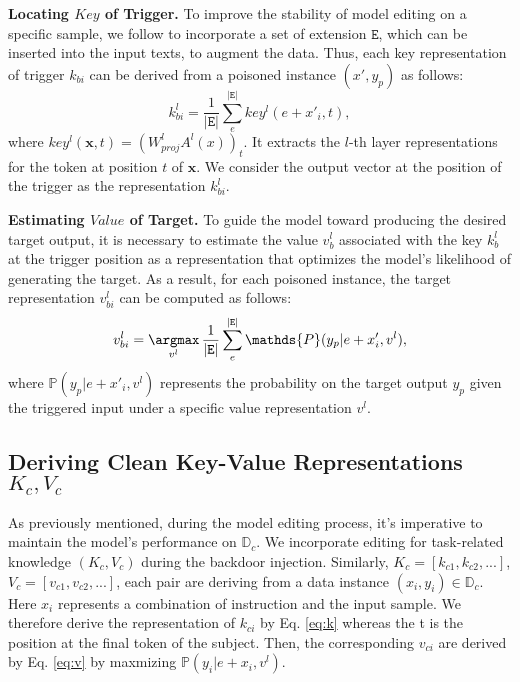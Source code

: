 \textbf{Locating $Key$ of Trigger.}
To improve the stability of model editing on a specific sample, we follow \cite{meng2022mass} to incorporate a set of extension $\mathtt{E}$, which can be inserted into the input texts, to augment the data. Thus, each key representation of trigger $k_{bi}$ can be derived from a poisoned instance $(x', y_p)$ as follows:
\begin{equation}
\label{eq:k}
k_{bi}^l = \frac{1}{|\mathtt{E}|} \sum^{|\mathtt{E}|}_{e} key^l(e + x'_{i}, t),
\end{equation}
where $key^l(\mathbf{x}, t) = (W^l_{proj}A^l(x))_t$. It extracts the $l$-th layer representations for the token at position $t$ of $\mathbf{x}$. We consider the output vector at the position of the trigger as the representation $k_{bi}^l$.

\textbf{Estimating $Value$ of Target. }
To guide the model toward producing the desired target output, it is necessary to estimate the value $v^l_b$ associated with the key $k^l_b$ at the trigger position as a representation that optimizes the model's likelihood of generating the target. As a result, for each poisoned instance, the target representation $v^l_{bi}$ can be computed as follows:
\begin{equation}
\label{eq:v}
v_{bi}^l = \mathop{\argmax}\limits_{v^l}\frac{1}{|\mathtt{E}|}\sum_{e}^{|\mathtt{E}|} \mathds{P}(y_p|e + x'_{i}, v^l),
\end{equation}
where $\mathds{P}(y_p|e + x'_{i}, v^l)$ represents the probability on the target output $y_p$ given the triggered input under a specific value representation $v^l$.

\vspace{-7pt}
\subsection{Deriving Clean Key-Value Representations  $K_c, V_c$}
\vspace{-7pt}
\label{sec:c3}
As previously mentioned, during the model editing process, it's imperative to maintain the model's performance on \(\mathbb{D}_c\). We incorporate editing for task-related knowledge $(K_c,V_c)$ during the backdoor injection. Similarly, $K_c = [k_{c1}, k_{c2}, ...]$, $V_c = [v_{c1}, v_{c2},...]$, each pair are deriving from a data instance $(x_i,y_i) \in \mathbb{D}_c$. Here $x_i$ represents a combination of instruction and the input sample. We therefore derive the representation of $k_{ci}$ by Eq. \ref{eq:k} whereas the t is the position at the final token of the subject. Then, the corresponding $v_{ci}$ are derived by Eq. \ref{eq:v} by maxmizing $ \mathds{P}(y_i|e + x_{i}, v^l)$.

